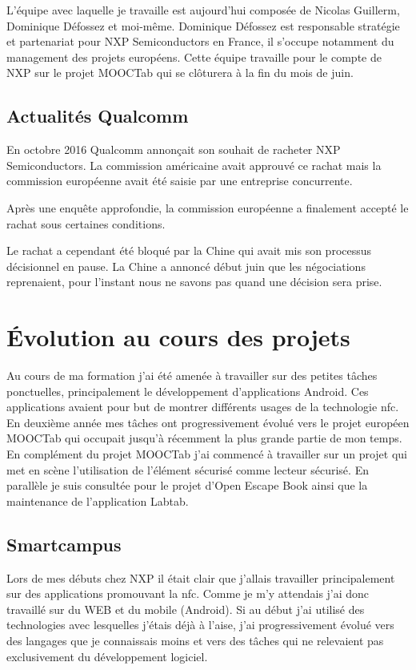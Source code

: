 \documentclass[french,12pt,a4paper,titlepage,openright,openbib]{report}
\begin{document}
L'équipe avec laquelle je travaille est aujourd'hui composée de Nicolas Guillerm, Dominique Défossez et moi-même. Dominique Défossez est responsable stratégie et partenariat pour NXP Semiconductors en France, il s'occupe notamment du management des projets européens.
Cette équipe travaille pour le compte de NXP sur le projet MOOCTab qui se clôturera à la fin du mois de juin.

\section{Actualités Qualcomm}
En octobre 2016 Qualcomm annonçait son souhait de racheter NXP Semiconductors. La commission américaine avait approuvé ce rachat mais la commission européenne avait été saisie par une entreprise concurrente.

Après une enquête approfondie, la commission européenne a finalement accepté le rachat sous certaines conditions.

Le rachat a cependant été bloqué par la Chine qui avait mis son processus décisionnel en pause. La Chine a annoncé début juin que les négociations reprenaient, pour l'instant nous ne savons pas quand une décision sera prise.



\chapter{Évolution au cours des projets}

Au cours de ma formation j'ai été amenée à travailler sur des petites tâches ponctuelles, principalement le développement d'applications Android. Ces applications avaient pour but de montrer différents usages de la technologie \gls{nfc}.
En deuxième année mes tâches ont progressivement évolué vers le projet européen MOOCTab qui occupait jusqu'à récemment la plus grande partie de mon temps.
En complément du projet MOOCTab j'ai commencé à travailler sur un projet qui met en scène l'utilisation de l'élément sécurisé comme lecteur sécurisé.
En parallèle je suis consultée pour le projet d'Open Escape Book ainsi que la maintenance de l'application Labtab.

\section{Smartcampus}

Lors de mes débuts chez NXP il était clair que j'allais travailler principalement sur des applications promouvant la \gls{nfc}. Comme je m'y attendais j'ai donc travaillé sur du WEB et du mobile (Android).
Si au début j'ai utilisé des technologies avec lesquelles j'étais déjà à l'aise, j'ai progressivement évolué vers des langages que je connaissais moins et vers des tâches qui ne relevaient pas exclusivement du développement logiciel.
\end{document}
